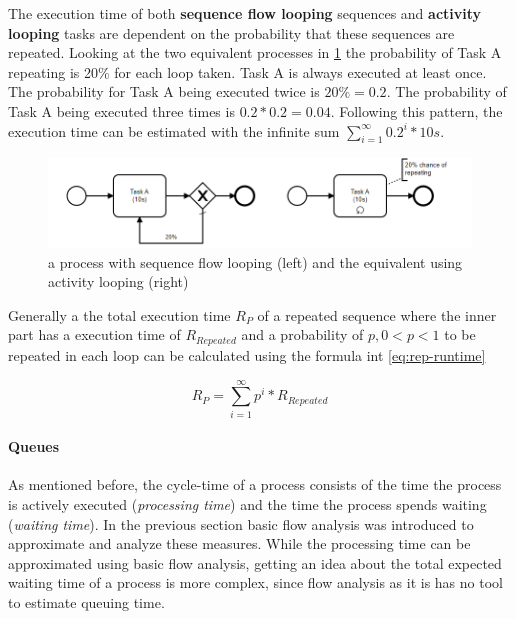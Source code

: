 \begin{itemize}
	The execution time of both \textbf{sequence flow looping} sequences and \textbf{activity looping} tasks are dependent on the probability that these sequences are repeated. Looking at the two equivalent processes in \ref{fig:repeated-example} the probability of Task A repeating is 20\% for each loop taken. Task A is always executed at least once. The probability for Task A being executed twice is $20\% = 0.2$. The probability of Task A being executed three times is $0.2 * 0.2 = 0.04$. Following this pattern, the execution time can be estimated with the infinite sum $\displaystyle\sum_{i=1}^{\infty} 0.2^i * 10s$.
	

	\begin{figure}[H]
		\centering
		\includegraphics[width=0.9\columnwidth]{graphics/repeated-example}
		\caption{a process with sequence flow looping (left) and the equivalent using activity looping (right)} 
		\label{fig:repeated-example} 
	\end{figure}

	Generally a the total execution time  $R_P$ of a repeated sequence where the inner part has a execution time of $R_{Repeated}$ and a probability of $p, 0 < p < 1$  to be repeated in each loop can be calculated using the formula int \ref{eq:rep-runtime}
	
	\begin{equation}\label{eq:rep-runtime}
		R_P = \displaystyle\sum_{i=1}^{\infty} p^i * R_{Repeated}
	\end{equation}
\end{itemize}


\paragraph{Queues}
As mentioned before, the \gls{cycle-time} of a process consists of the time the process is actively executed (\textit{processing time}) and the time the process spends waiting (\textit{waiting time}). In the previous section basic flow analysis was introduced to approximate and analyze these measures.  
While the processing time can be approximated using basic flow analysis, getting an idea about the total expected waiting time of a process is more complex, since flow analysis as it is has no tool to estimate queuing time. 


